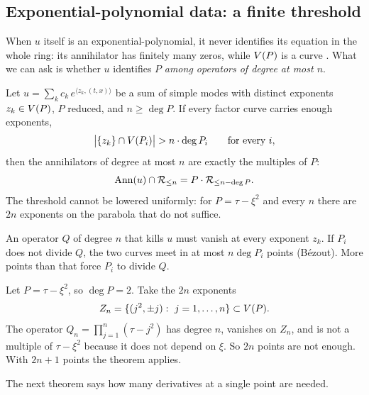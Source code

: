 \subsection{Exponential-polynomial data: a finite threshold}

When $u$ itself is an exponential-polynomial, it never identifies its equation in the whole ring: its annihilator has finitely many zeros, while $V(P)$ is a curve . What we can ask is whether $u$ identifies $P$ \emph{among operators of degree at most $n$}.

\begin{theorem}\label{thm:bezout}
Let $u=\sum_kc_k\,e^{\langle z_k,(t,x)\rangle}$ be a sum of simple modes with distinct exponents $z_k\in V(P)$, $P$ reduced, and $n\ge\deg P$. If every factor curve carries enough exponents,
\[
\big|\{z_k\}\cap\Var(P_i)\big|>n\cdot\deg P_i\qquad\text{for every }i,
\]
then the annihilators of degree at most $n$ are exactly the multiples of $P$:
\[
\operatorname{Ann}(u)\cap\mathcal{R}_{\le n}=P\cdot\mathcal{R}_{\le n-\deg P}.
\]
The threshold cannot be lowered uniformly: for $P=\tau-\xi^2$ and every $n$ there are $2n$ exponents on the parabola that do not suffice.

\end{theorem}

\begin{intuition}
An operator $Q$ of degree $n$ that kills $u$ must vanish at every exponent $z_k$. If $P_i$ does not divide $Q$, the two curves meet in at most $n\deg P_i$ points (B\'ezout). More points than that force $P_i$ to divide $Q$.
\end{intuition}

\begin{example}
Let $P=\tau-\xi^2$, so $\deg P=2$. Take the $2n$ exponents
\[
Z_n=\{(j^2,\pm j):\ j=1,\dots,n\}\subset\Var(P).
\]
The operator $Q_n=\prod_{j=1}^n(\tau-j^2)$ has degree $n$, vanishes on $Z_n$, and is not a multiple of $\tau-\xi^2$ because it does not depend on $\xi$. So $2n$ points are not enough. With $2n+1$ points the theorem applies.
\end{example}

The next theorem says how many derivatives at a single point are needed.

